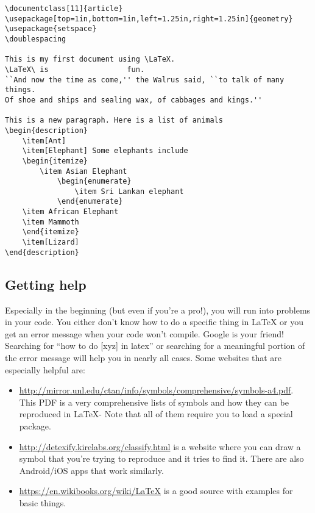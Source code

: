 \begin{lstlisting}
\documentclass[11]{article}
\usepackage[top=1in,bottom=1in,left=1.25in,right=1.25in]{geometry}
\usepackage{setspace}
\doublespacing

This is my first document using \LaTeX.
\LaTeX\ is                  fun.
``And now the time as come,'' the Walrus said, ``to talk of many things.
Of shoe and ships and sealing wax, of cabbages and kings.''

This is a new paragraph. Here is a list of animals
\begin{description}
	\item[Ant]
	\item[Elephant] Some elephants include
	\begin{itemize}
		\item Asian Elephant
			\begin{enumerate}
				\item Sri Lankan elephant
			\end{enumerate}
	\item African Elephant
	\item Mammoth
	\end{itemize}
	\item[Lizard]
\end{description}

\end{lstlisting}

\subsection{Getting help}

Especially in the beginning (but even if you're a pro!), you will run into problems in your code. You either don't know how to do a specific thing in \LaTeX{} or you get an error message when your code won't compile. Google is your friend! Searching for ``how to do [xyz] in latex'' or searching for a meaningful portion of the error message will help you in nearly all cases. Some websites that are especially helpful are:

\begin{itemize}
\item \url{http://mirror.unl.edu/ctan/info/symbols/comprehensive/symbols-a4.pdf}. This PDF is a very comprehensive lists of symbols and how they can be reproduced in \LaTeX{}- Note that all of them require you to load a special package.
\item \url{http://detexify.kirelabs.org/classify.html} is a website where you can draw a symbol that you're trying to reproduce and it tries to find it. There are also Android/iOS apps that work similarly.
\item \url{https://en.wikibooks.org/wiki/LaTeX} is a good source with examples for basic things.
\end{itemize}


